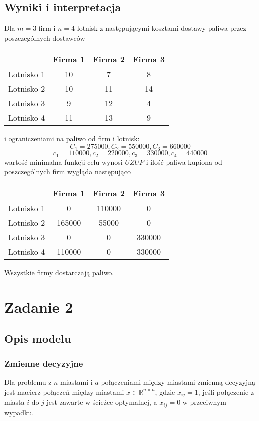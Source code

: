 \documentclass{article}
\begin{document}
\subsection{Wyniki i interpretacja}
Dla $m=3$ firm i $n=4$ lotnisk z następującymi kosztami dostawy paliwa przez poszczególnych dostawców
\begin{center}
\begin{tabular}{| c | c c c |}
\hline
 & Firma 1 & Firma 2 & Firma 3\\
 \hline
Lotnisko 1 & 10 & 7 & 8\\
Lotnisko 2 & 10 & 11 & 14\\
Lotnisko 3 & 9 & 12 & 4\\
Lotnisko 4 & 11 & 13 & 9\\
\hline
\end{tabular}
\end{center}
i ograniczeniami na paliwo od firm i lotnisk:
\[C_1=275000, C_2=550000, C_3=660000\] \[c_1=110000, c_2=220000, c_3=330000, c_4=440000\]
wartość minimalna funkcji celu wynosi \(UZUP\) i ilość paliwa kupiona od poszczególnych firm wygląda następująco
\begin{center}
\begin{tabular}{| c | c c c |}
\hline
 & Firma 1 & Firma 2 & Firma 3\\
\hline
Lotnisko 1 & 0 & 110000 & 0\\
Lotnisko 2 & 165000 & 55000 & 0 \\
Lotnisko 3 & 0 & 0 & 330000 \\
Lotnisko 4 & 110000 &  0 & 330000 \\
\hline
\end{tabular}
\end{center}
Wszystkie firmy dostarczają paliwo.

\section{Zadanie 2}
\subsection{Opis modelu}
\subsubsection{Zmienne decyzyjne}
Dla problemu z \(n\) miastami i \(a\) połączeniami między miastami zmienną decyzyjną jest macierz połączeń między miastami \(x\in \mathbb{R}^{n\times n}\), gdzie \(x_{ij}=1\), jeśli połączenie z miasta \(i\) do \(j\) jest zawarte w ścieżce optymalnej, a \(x_{ij} = 0\) w przeciwnym wypadku.
\end{document}
